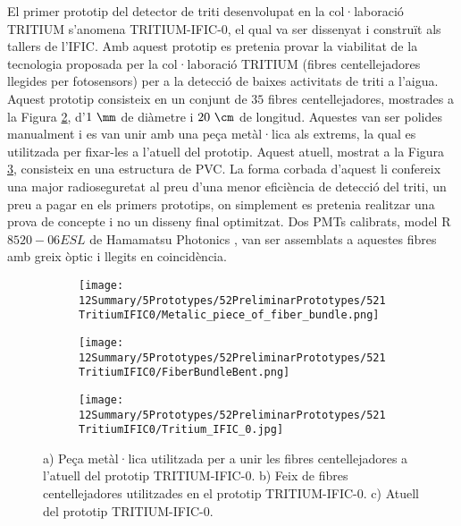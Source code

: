 El primer prototip del detector de triti desenvolupat en la col·laboració TRITIUM s'anomena TRITIUM-IFIC-0, el qual va ser dissenyat i construït als tallers de l'IFIC. Amb aquest prototip es pretenia provar la viabilitat de la tecnologia proposada per la col·laboració TRITIUM (fibres centellejadores llegides per fotosensors) per a la detecció de baixes activitats de triti a l'aigua. Aquest prototip consisteix en un conjunt de $35$ fibres centellejadores, mostrades a la Figura \ref{subfig:FibresDobladesTritiumIFIC0}, d'$1~\mm$ de diàmetre i $20~\cm$ de longitud. Aquestes van ser polides manualment i es van unir amb una peça metàl·lica als extrems, la qual es utilitzada per fixar-les a l'atuell del prototip. Aquest atuell, mostrat a la Figura \ref{subfig:PrototipTritiumIFIC0}, consisteix en una estructura de PVC. La forma corbada d'aquest li confereix una major radioseguretat al preu d'una menor eficiència de detecció del triti, un preu a pagar en els primers prototips, on simplement es pretenia realitzar una prova de concepte i no un disseny final optimitzat. Dos PMTs calibrats, model R$8520-06ESL$ de Hamamatsu Photonics \cite{DataSheetPMTs}, van ser assemblats a aquestes fibres amb greix òptic \cite{OpticalGrease} i llegits en coincidència.

\begin{figure}
\centering
    \begin{subfigure}[b]{0.5\textwidth}
    \centering
    \texttt{[image: 12Summary/5Prototypes/52PreliminarPrototypes/521TritiumIFIC0/Metalic\_piece\_of\_fiber\_bundle.png]}  
    \caption{\label{subfig:PesaMetalicaFibresTritiumIFIC0}}
    \end{subfigure}
    \hfill
    \begin{subfigure}[b]{0.4\textwidth}
    \centering
    \texttt{[image: 12Summary/5Prototypes/52PreliminarPrototypes/521TritiumIFIC0/FiberBundleBent.png]}  
    \caption{\label{subfig:FibresDobladesTritiumIFIC0}}
    \end{subfigure}
    \hfill
    \begin{subfigure}[b]{0.7\textwidth}
    \centering
    \texttt{[image: 12Summary/5Prototypes/52PreliminarPrototypes/521TritiumIFIC0/Tritium\_IFIC\_0.jpg]}  
    \caption{\label{subfig:PrototipTritiumIFIC0}}
    \end{subfigure}
 \caption{a) Peça metàl·lica utilitzada per a unir les fibres centellejadores a l'atuell del prototip TRITIUM-IFIC-0. b) Feix de fibres centellejadores utilitzades en el prototip TRITIUM-IFIC-0. c) Atuell del prototip TRITIUM-IFIC-0.} \label{fig:TritiumIFIC0s}
\end{figure}

